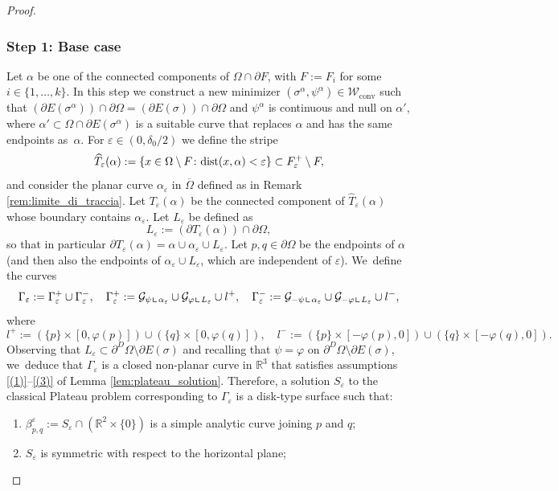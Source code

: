 \documentclass[JEP,XML,SOM,Unicode, NoFloatCountersInSection,published]{cedram}
\newcommand{\R}{\mathbb{R}}
\let\eps\varepsilon
\let\Om\Omega
\newcommand\admclassconv{{\mathcal W_\mathrm{conv}}}
\newcommand{\dist}{\textup{dist}}
\newcommand{\resa}{\mathop{\hbox{\vrule height 7pt width 0.5pt depth 0pt
\vrule height 0.5pt width 6pt depth 0pt}}\nolimits}
\newcommand{\resb}{\mathop{\hbox{\vrule height 4pt width 0.5pt depth 0pt
\vrule height 0.5pt width 3pt depth 0pt}}\nolimits}
\newcommand{\res}{\mathchoice{\resa}{\resa}{\resb}{\resb}}
\theoremstyle{definition}
\begin{document}
\begin{proof}
\subsubsection*{Step 1: Base case} Let $\alpha$ be one of the connected components of $\Om\cap\partial F$, with $F:=F_i$ for some $i\in\{1,\dots,k\}$.
In this step we construct a new minimizer $(\sigma^\alpha,\psi^\alpha)\in\admclassconv$ such that $(\partial E(\sigma^\alpha))\cap\partial\Om=(\partial E(\sigma))\cap\partial\Om$
and
$\psi^\alpha$ is continuous and null on $\alpha'$, where
$\alpha'\subset\Om\cap\partial E(\sigma^\alpha)$ is a suitable curve that replaces $\alpha$ and has the same endpoints as~$\alpha$.
For $\eps\in(0,\delta_0/2)$ we define the stripe
\[
\widehat T_\eps(\alpha):=\{x\in\Om\setminus F\colon\dist(x,\alpha)<\eps\}\subset F^+_\eps\setminus F,
\]
and consider the planar curve $\alpha_\eps$ in $\overline\Om$ defined as in Remark \ref{rem:limite_di_traccia}.
Let $T_\eps(\alpha)$ be the connected component of $\widehat T_\eps(\alpha)$ whose boundary contains $\alpha_\eps$. Let $L_\eps$ be defined as
\[
 L_\eps:=(\partial T_\eps(\alpha))\cap \partial\Om,
\]
so that in particular
$\partial T_\eps(\alpha)=\alpha\cup\alpha_\eps\cup L_\eps $.
Let $p,q\in \partial\Om$ be the endpoints of $\alpha$ (and then also the endpoints of $\alpha_\eps\cup L_\eps$, which are independent of $\eps$). We~define the curves
\[
\Gamma_\eps:=\Gamma_\eps^+\cup\Gamma_\eps^-,\quad
\Gamma_\eps^+:=\mathcal{G}_{\psi\res\alpha_\eps}\cup \mathcal{G}_{\varphi\res L_\eps}\cup l^+,\quad \Gamma_\eps^-:=\mathcal{G}_{-\psi\res\alpha_\eps}\cup \mathcal{G}_{-\varphi\res L_\eps}\cup l^-,
\]
where
\begin{equation*}
l^+:=(\{p\}\times[0,\varphi(p)])\cup (\{q\}\times[0,\varphi(q)]),\quad
l^-:=(\{p\}\times[-\varphi(p),0])\cup(\{q\}\times[-\varphi(q),0]).
\end{equation*}
Observing that $L_\eps\subset\partial^D\Om\setminus\partial E(\sigma)$ and recalling that $\psi=\varphi$ on $\partial^D\Om\setminus\partial E(\sigma)$, we~deduce that
$\Gamma_\eps$ is a closed non-planar curve in $\R^3$ that satisfies assumptions \ref{(1)}--\ref{(3)} of Lemma \ref{lem:plateau_solution}.
Therefore, a solution $S_\eps$ to the classical Plateau problem corresponding to $\Gamma_\eps$ is a disk-type surface such that:
\begin{enumerate}[{\rm (1)},wide]
\item $\beta_{p,q}^\eps:=S_\eps\cap(\R^2\times\{0\})$ is a simple analytic curve joining $p$ and $q$;
\item $S_\eps$ is symmetric with respect to the horizontal plane;

\end{enumerate}
\end{proof}
\end{document}
